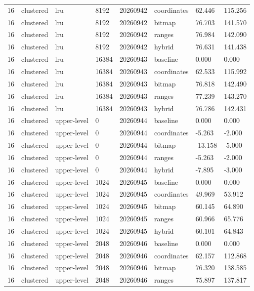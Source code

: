 \begin{tabular}{llllllll}
16 & clustered & lru & 8192 & 20260942 & coordinates & 62.446 & 115.256 \\
16 & clustered & lru & 8192 & 20260942 & bitmap & 76.703 & 141.570 \\
16 & clustered & lru & 8192 & 20260942 & ranges & 76.984 & 142.090 \\
16 & clustered & lru & 8192 & 20260942 & hybrid & 76.631 & 141.438 \\
16 & clustered & lru & 16384 & 20260943 & baseline & 0.000 & 0.000 \\
16 & clustered & lru & 16384 & 20260943 & coordinates & 62.533 & 115.992 \\
16 & clustered & lru & 16384 & 20260943 & bitmap & 76.818 & 142.490 \\
16 & clustered & lru & 16384 & 20260943 & ranges & 77.239 & 143.270 \\
16 & clustered & lru & 16384 & 20260943 & hybrid & 76.786 & 142.431 \\
16 & clustered & upper-level & 0 & 20260944 & baseline & 0.000 & 0.000 \\
16 & clustered & upper-level & 0 & 20260944 & coordinates & -5.263 & -2.000 \\
16 & clustered & upper-level & 0 & 20260944 & bitmap & -13.158 & -5.000 \\
16 & clustered & upper-level & 0 & 20260944 & ranges & -5.263 & -2.000 \\
16 & clustered & upper-level & 0 & 20260944 & hybrid & -7.895 & -3.000 \\
16 & clustered & upper-level & 1024 & 20260945 & baseline & 0.000 & 0.000 \\
16 & clustered & upper-level & 1024 & 20260945 & coordinates & 49.969 & 53.912 \\
16 & clustered & upper-level & 1024 & 20260945 & bitmap & 60.145 & 64.890 \\
16 & clustered & upper-level & 1024 & 20260945 & ranges & 60.966 & 65.776 \\
16 & clustered & upper-level & 1024 & 20260945 & hybrid & 60.101 & 64.843 \\
16 & clustered & upper-level & 2048 & 20260946 & baseline & 0.000 & 0.000 \\
16 & clustered & upper-level & 2048 & 20260946 & coordinates & 62.157 & 112.868 \\
16 & clustered & upper-level & 2048 & 20260946 & bitmap & 76.320 & 138.585 \\
16 & clustered & upper-level & 2048 & 20260946 & ranges & 75.897 & 137.817 \\

\end{tabular}
